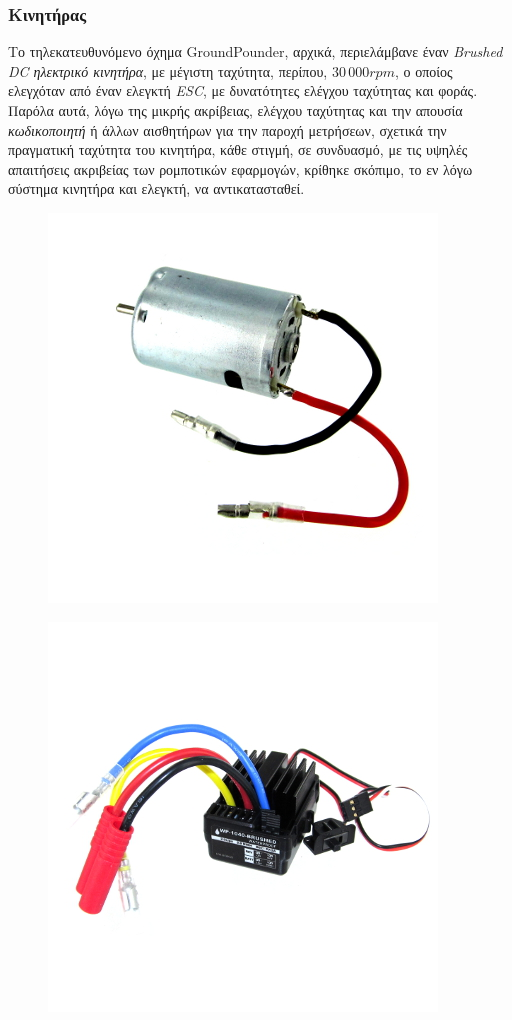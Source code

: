 \bigskip
\subsubsection{Κινητήρας}
Το τηλεκατευθυνόμενο όχημα GroundPounder, αρχικά, περιελάμβανε έναν \textit{Brushed DC ηλεκτρικό κινητήρα}, με μέγιστη ταχύτητα, περίπου, $30\,000rpm$, ο οποίος ελεγχόταν από έναν ελεγκτή \textit{ESC}, με δυνατότητες ελέγχου ταχύτητας και φοράς. Παρόλα αυτά, λόγω της μικρής ακρίβειας, ελέγχου ταχύτητας και την απουσία \textit{κωδικοποιητή} ή άλλων αισθητήρων για την παροχή μετρήσεων, σχετικά την πραγματική ταχύτητα του κινητήρα, κάθε στιγμή, σε συνδυασμό, με τις υψηλές απαιτήσεις ακριβείας των ρομποτικών εφαρμογών, κρίθηκε σκόπιμο, το εν λόγω σύστημα κινητήρα και ελεγκτή, να αντικατασταθεί.

\begin{figure}[!ht]
	\begin{minipage}{.49\textwidth}
 	\centering
		\includegraphics[width=0.6\linewidth]{Chapters/Chapter2/Figures/original_motor.jpg}
		\label{fig:original_motor}
	\end{minipage}
	\begin{minipage}{.5\textwidth}		
		\centering
		\includegraphics[width=0.6\linewidth]{Chapters/Chapter2/Figures/esc.jpg}
		\label{fig:esc}
	\end{minipage}
\end{figure}

